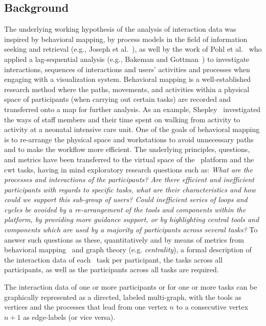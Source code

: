 \subsection{Background} \label{sec:background}
%
The underlying working hypothesis of the analysis of interaction data was inspired by behavioral mapping, by process models in the field of information seeking and retrieval (e.g., Joseph et al.~\cite{joseph2013models}), as well by the work of Pohl et al.~\cite{pohl2016using} who applied a lag-sequential analysis (e.g., Bakeman and Gottman~\cite{bakeman1997observing}) to investigate interactions, sequences of interactions and users' activities and processes when engaging with a visualization system. 
%
Behavioral mapping is a well-established research method where the paths, movements, and activities within a physical space of participants (when carrying out certain tasks) are recorded and transferred onto a map for further analysis. 
%
As an example, Shepley~\cite{shepley2002predesign} investigated the ways of staff members and their time spent on walking from activity to activity at a neonatal intensive care unit. 
%
One of the goals of behavioral mapping is to re-arrange the physical space and workstations to avoid unnecessary paths and to make the workflow more efficient. 
%
The underlying principles, questions, and metrics have been transferred to the virtual space of the \apluschis\ platform and the \acrshort{cwt} tasks, having in mind exploratory research questions such as: \emph{What are the processes and interactions of the participants? 
%
Are there efficient and inefficient participants with regards to specific tasks, what are their characteristics and how could we support this sub-group of users? 
%
Could inefficient series of loops and cycles be avoided by a re-arrangement of the tools and components within the platform, by providing more guidance support, or by highlighting central tools and components which are used by a majority of participants across several tasks?} 
%
To answer such questions as these, quantitatively and by means of metrics from behavioral mapping~\cite{ng2016behavioral} and graph theory (e.g. \emph{centrality}), a formal description of the interaction data of each \cwt\ task per participant, the tasks across all participants, as well as the participants across all tasks are required. 


The interaction data of one or more participants or for one or more tasks can be graphically represented as a directed, labeled multi-graph, with the tools as vertices and the processes that lead from one vertex $n$ to a consecutive vertex $n+1$ as edge-labels (or vice versa). 


